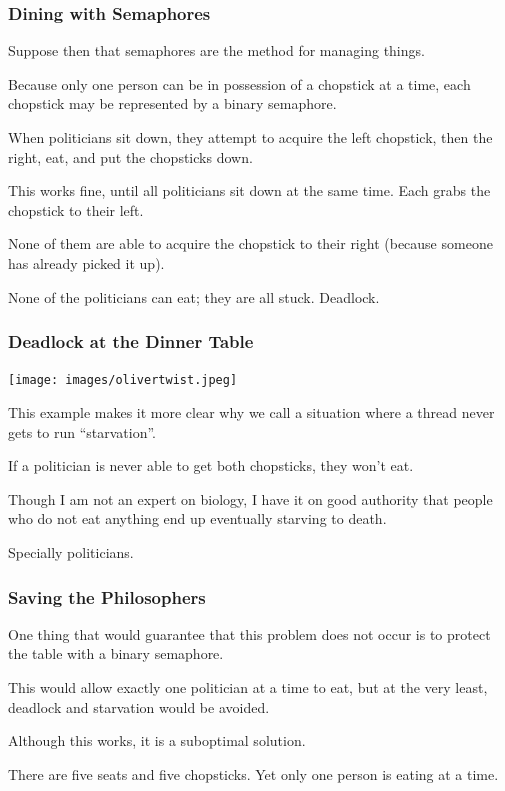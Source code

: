 \begin{frame}
	\frametitle{Dining with Semaphores}

	Suppose then that semaphores are the method for managing things.

	Because only one person can be in possession of a chopstick at a time, each chopstick may be represented by a binary semaphore.

	When politicians sit down, they attempt to acquire the left chopstick, then the right, eat, and put the chopsticks down.

	This works fine, until all politicians sit down at the same time. Each grabs the chopstick to their left.

	None of them are able to acquire the chopstick to their right (because someone has already picked it up).

	None of the politicians can eat; they are all stuck. Deadlock.

\end{frame}

\begin{frame}
	\frametitle{Deadlock at the Dinner Table}

	\begin{center}
		\texttt{[image: images/olivertwist.jpeg]}
	\end{center}

	This example makes it more clear why we call a situation where a thread never gets to run ``starvation''.

	If a politician is never able to get both chopsticks, they won't eat.

	Though I am not an expert on biology, I have it on good authority that people who do not eat anything end up eventually starving to death.

	Specially politicians.

\end{frame}

\begin{frame}
	\frametitle{Saving the Philosophers}

	One thing that would guarantee that this problem does not occur is to protect the table with a binary semaphore.

	This would allow exactly one politician at a time to eat, but at the very least, deadlock and starvation would be avoided.

	Although this works, it is a suboptimal solution.

	There are five seats and five chopsticks. Yet only one person is eating at a time.

\end{frame}


